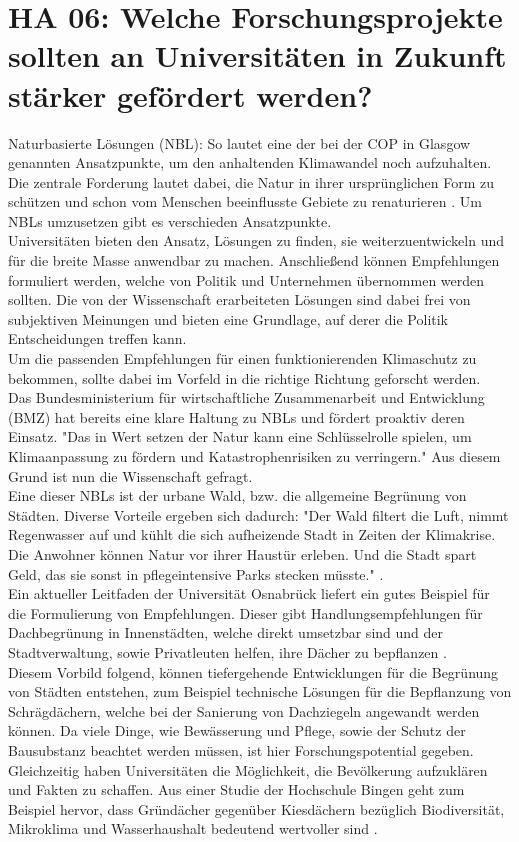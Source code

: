 \section{HA 06: Welche Forschungsprojekte sollten an Universitäten in Zukunft stärker gefördert werden?}
Naturbasierte Lösungen (NBL): So lautet eine der bei der COP in Glasgow genannten Ansatzpunkte, um den anhaltenden Klimawandel noch aufzuhalten. Die zentrale Forderung lautet dabei, die Natur in ihrer ursprünglichen Form zu schützen und schon vom Menschen beeinflusste Gebiete zu renaturieren \cite{wahnbaeck_nature-based_2021}. Um NBLs umzusetzen gibt es verschieden Ansatzpunkte.\\
Universitäten bieten den Ansatz, Lösungen zu finden, sie weiterzuentwickeln und für die breite Masse anwendbar zu machen. Anschließend können Empfehlungen formuliert werden, welche von Politik und Unternehmen übernommen werden sollten. Die von der Wissenschaft erarbeiteten Lösungen sind dabei frei von subjektiven Meinungen und bieten eine Grundlage, auf derer die Politik Entscheidungen treffen kann.\\
Um die passenden Empfehlungen für einen funktionierenden Klimaschutz zu bekommen, sollte dabei im Vorfeld in die richtige Richtung geforscht werden.\\
Das Bundesministerium für wirtschaftliche Zusammenarbeit und Entwicklung (BMZ) hat bereits eine klare Haltung zu NBLs und fördert proaktiv deren Einsatz. "Das in Wert setzen der Natur kann eine Schlüsselrolle spielen, um Klimaanpassung zu fördern
und Katastrophenrisiken zu verringern." \cite{bundesministerium_fur_wirtschaftliche_zusammenarbeit_und_entwicklung_naturbasierte_2021} Aus diesem Grund ist nun die Wissenschaft gefragt.\\
Eine dieser NBLs ist der urbane Wald, bzw. die allgemeine Begrünung von Städten. Diverse Vorteile ergeben sich dadurch: "Der Wald filtert die Luft, nimmt Regenwasser auf und kühlt die sich aufheizende Stadt in Zeiten der Klimakrise. Die Anwohner können Natur vor ihrer Haustür erleben. Und die Stadt spart Geld, das sie sonst in pflegeintensive Parks stecken müsste." \cite{wahnbaeck_nature-based_2021}.\\
Ein aktueller Leitfaden der Universität Osnabrück liefert ein gutes Beispiel für die Formulierung von Empfehlungen. Dieser gibt Handlungsempfehlungen für Dachbegrünung in Innenstädten, welche direkt umsetzbar sind und der Stadtverwaltung, sowie Privatleuten helfen, ihre Dächer zu bepflanzen \cite{schroder_extensive_2020}.\\
Diesem Vorbild folgend, können tiefergehende Entwicklungen für die Begrünung von Städten entstehen, zum Beispiel technische Lösungen für die Bepflanzung von Schrägdächern, welche bei der Sanierung von Dachziegeln angewandt werden können. Da viele Dinge, wie Bewässerung und Pflege, sowie der Schutz der Bausubstanz beachtet werden müssen, ist hier Forschungspotential gegeben.\\
Gleichzeitig haben Universitäten die Möglichkeit, die Bevölkerung aufzuklären und Fakten zu schaffen. Aus einer Studie der Hochschule Bingen geht zum Beispiel hervor, dass Gründächer gegenüber Kiesdächern bezüglich Biodiversität, Mikroklima und Wasserhaushalt bedeutend wertvoller sind \cite{hietel_extensive_2016}.

